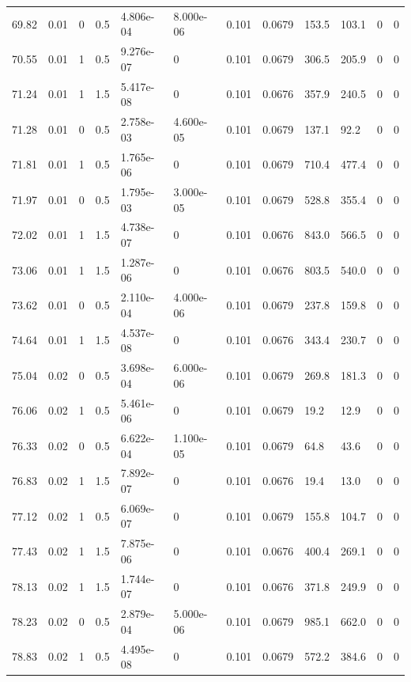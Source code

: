 \documentclass[preview]{standalone}
\begin{document}
{{{{{\begin{tabular}{L{1.2cm}C{1.2cm} C{0.3cm}C{0.5cm} C{1.4cm}C{1.4cm} C{1.4cm}C{1.4cm} C{1.6cm}C{1.6cm} C{1.6cm}C{1.6cm}}
  69.82  &  0.01  & 0     & 0.5 &  4.806e-04  & 8.000e-06  &  0.101&   0.0679& 153.5 & 103.1   &  0 & 0  \\ 
  70.55  &  0.01  & 1     & 0.5 &  9.276e-07  & 0  &  0.101&   0.0679& 306.5 & 205.9   &  0 & 0  \\ 
  71.24  &  0.01  & 1     & 1.5 &  5.417e-08  & 0  &  0.101&   0.0676& 357.9 & 240.5   &  0 & 0  \\ 
  71.28  &  0.01  & 0     & 0.5 &  2.758e-03  & 4.600e-05  &  0.101&   0.0679& 137.1 & 92.2   &  0 & 0  \\ 
  71.81  &  0.01  & 1     & 0.5 &  1.765e-06  & 0  &  0.101&   0.0679& 710.4 & 477.4   &  0 & 0  \\ 
  71.97  &  0.01  & 0     & 0.5 &  1.795e-03  & 3.000e-05  &  0.101&   0.0679& 528.8 & 355.4   &  0 & 0  \\ 
  72.02  &  0.01  & 1     & 1.5 &  4.738e-07  & 0  &  0.101&   0.0676& 843.0 & 566.5   &  0 & 0  \\ 
  73.06  &  0.01  & 1     & 1.5 &  1.287e-06  & 0  &  0.101&   0.0676& 803.5 & 540.0   &  0 & 0  \\ 
  73.62  &  0.01  & 0     & 0.5 &  2.110e-04  & 4.000e-06  &  0.101&   0.0679& 237.8 & 159.8   &  0 & 0  \\ 
  74.64  &  0.01  & 1     & 1.5 &  4.537e-08  & 0  &  0.101&   0.0676& 343.4 & 230.7   &  0 & 0  \\ 
  75.04  &  0.02  & 0     & 0.5 &  3.698e-04  & 6.000e-06  &  0.101&   0.0679& 269.8 & 181.3   &  0 & 0  \\ 
  76.06  &  0.02  & 1     & 0.5 &  5.461e-06  & 0  &  0.101&   0.0679& 19.2 & 12.9   &  0 & 0  \\ 
  76.33  &  0.02  & 0     & 0.5 &  6.622e-04  & 1.100e-05  &  0.101&   0.0679& 64.8 & 43.6   &  0 & 0  \\ 
  76.83  &  0.02  & 1     & 1.5 &  7.892e-07  & 0  &  0.101&   0.0676& 19.4 & 13.0   &  0 & 0  \\ 
  77.12  &  0.02  & 1     & 0.5 &  6.069e-07  & 0  &  0.101&   0.0679& 155.8 & 104.7   &  0 & 0  \\ 
  77.43  &  0.02  & 1     & 1.5 &  7.875e-06  & 0  &  0.101&   0.0676& 400.4 & 269.1   &  0 & 0  \\ 
  78.13  &  0.02  & 1     & 1.5 &  1.744e-07  & 0  &  0.101&   0.0676& 371.8 & 249.9   &  0 & 0  \\ 
  78.23  &  0.02  & 0     & 0.5 &  2.879e-04  & 5.000e-06  &  0.101&   0.0679& 985.1 & 662.0   &  0 & 0  \\ 
  78.83  &  0.02  & 1     & 0.5 &  4.495e-08  & 0  &  0.101&   0.0679& 572.2 & 384.6   &  0 & 0  \\ 

\end{tabular}}}}}}
\end{document}
